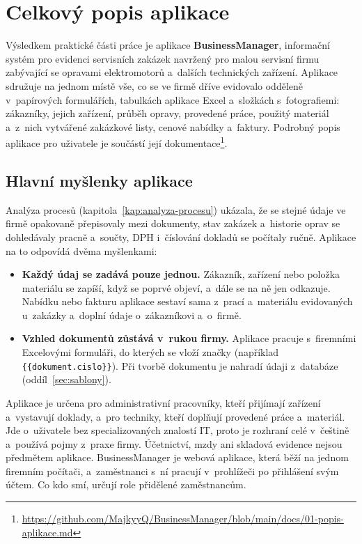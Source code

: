 \section{Celkový popis aplikace}\label{sec:popis-aplikace}

Výsledkem praktické části práce je aplikace \textbf{BusinessManager}, informační systém pro evidenci servisních zakázek navržený pro malou servisní firmu zabývající se opravami elektromotorů a~dalších technických zařízení. Aplikace sdružuje na jednom místě vše, co se ve firmě dříve evidovalo odděleně v~papírových formulářích, tabulkách aplikace Excel a~složkách s~fotografiemi: zákazníky, jejich zařízení, průběh opravy, provedené práce, použitý materiál a~z~nich vytvářené zakázkové listy, cenové nabídky a~faktury. Podrobný popis aplikace pro uživatele je součástí její dokumentace\footnote{\url{https://github.com/MajkyyQ/BusinessManager/blob/main/docs/01-popis-aplikace.md}}.

\subsection{Hlavní myšlenky aplikace}\label{sec:popis-aplikace-problem}

Analýza procesů (kapitola~\ref{kap:analyza-procesu}) ukázala, že se stejné údaje ve firmě opakovaně přepisovaly mezi dokumenty, stav zakázek a~historie oprav se dohledávaly pracně a~součty, DPH i~číslování dokladů se počítaly ručně. Aplikace na to odpovídá dvěma myšlenkami:

\begin{itemize}
\item \textbf{Každý údaj se zadává pouze jednou.} Zákazník, zařízení nebo položka materiálu se zapíší, když se poprvé objeví, a~dále se na ně jen odkazuje. Nabídku nebo fakturu aplikace sestaví sama z~prací a~materiálu evidovaných u~zakázky a~doplní údaje o~zákazníkovi a~o~firmě.
\item \textbf{Vzhled dokumentů zůstává v~rukou firmy.} Aplikace pracuje s~firemními Excelovými formuláři, do kterých se vloží značky (například \texttt{\{\{dokument.cislo\}\}}). Při tvorbě dokumentu je nahradí údaji z~databáze (oddíl~\ref{sec:sablony}).
\end{itemize}

Aplikace je určena pro administrativní pracovníky, kteří přijímají zařízení a~vystavují doklady, a~pro techniky, kteří doplňují provedené práce a~materiál. Jde o~uživatele bez specializovaných znalostí IT, proto je rozhraní celé v~češtině a~používá pojmy z~praxe firmy. Účetnictví, mzdy ani skladová evidence nejsou předmětem aplikace. BusinessManager je webová aplikace, která běží na jednom firemním počítači, a~zaměstnanci s~ní pracují v~prohlížeči po přihlášení svým účtem. Co kdo smí, určují role přidělené zaměstnancům.


